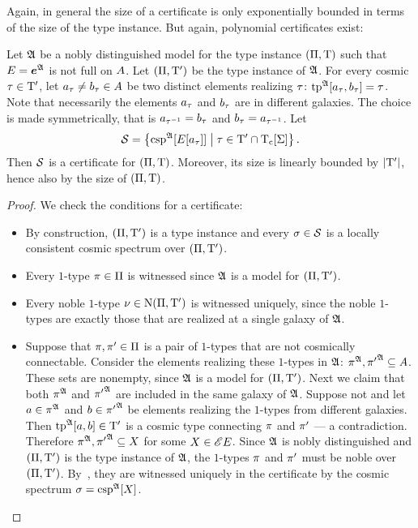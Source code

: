 Again, in general the size of a certificate is only exponentially bounded in
terms of the size of the type instance. But again, polynomial certificates
exist:
\begin{lemma}\label{lem:cert-extr-many}
Let $\mathfrak{A}$ be a nobly distinguished model for the type instance
$(\Pi,\mathrm{T})$ such that $E = \bm{e}^{\mathfrak{A}}$ is not full on $A$.
Let $(\Pi,{\mathrm{T}'})$ be the type instance of $\mathfrak{A}$. For every cosmic $\tau
\in {\mathrm{T}'}$, let $a_{\tau} \neq b_{\tau} \in A$ be two distinct elements
realizing $\tau$: $\operatorname{tp}^{\mathfrak{A}}[a_{\tau},b_{\tau}] = \tau$. Note that
necessarily the elements $a_{\tau}$ and $b_{\tau}$ are in different galaxies.
The choice is made symmetrically, that is $a_{\tau^{-1}} = b_{\tau}$ and
$b_{\tau} = a_{\tau^{-1}}$. Let
\[
  \mathcal{S} = \left\{\operatorname{csp}^{\mathfrak{A}}[E[a_{\tau}]]\mathrel{}\middle|\mathrel{}\tau \in {\mathrm{T}'} \cap
  \mathrm{T}_{\mathrm{c}}[\mathrm{\Sigma}]\right\}.
\]
Then $\mathcal{S}$ is a certificate for $(\Pi,\mathrm{T})$.
Moreover, its size is linearly bounded by $\left|{\mathrm{T}'}\right|$, hence also by the size
of $(\Pi,\mathrm{T})$.
\end{lemma}
\begin{proof}
We check the conditions for a certificate:
\begin{itemize}
  \item[\refcertcondIp] By construction, $(\Pi,{\mathrm{T}'})$ is a type instance
  and every $\sigma \in \mathcal{S}$ is a locally consistent cosmic spectrum over
  $(\Pi,{\mathrm{T}'})$.
  \item[\refcertcondIIp] Every $1$-type $\pi \in \Pi$ is witnessed since
  $\mathfrak{A}$ is a model for $(\Pi,{\mathrm{T}'})$.
  \item[\refcertcondIIIp] Every noble $1$-type $\nu \in \mathrm{\mathrm{N}}(\Pi,{\mathrm{T}'})$ is
  witnessed uniquely, since the noble $1$-types are exactly those that are
  realized at a single galaxy of $\mathfrak{A}$.
  \item[\refcertcondIVp] Suppose that $\pi, {\pi'} \in \Pi$ is a pair of
  $1$-types that are not cosmically connectable. Consider the elements realizing
  these $1$-types in $\mathfrak{A}$: $\pi^{\mathfrak{A}}, {\pi'}^{\mathfrak{A}} \subseteq A$.
  These sets are nonempty, since $\mathfrak{A}$ is a model for $(\Pi,{\mathrm{T}'})$.
  Next we claim that both $\pi^{\mathfrak{A}}$ and ${\pi'}^{\mathfrak{A}}$ are included in
  the same galaxy of $\mathfrak{A}$. Suppose not and let $a \in \pi^{\mathfrak{A}}$ and
  $b \in {\pi'}^{\mathfrak{A}}$ be elements realizing the $1$-types from different
  galaxies. Then $\operatorname{tp}^{\mathfrak{A}}[a,b] \in {\mathrm{T}'}$ is a cosmic type connecting
  $\pi$ and ${\pi'}$ --- a contradiction.
  Therefore $\pi^{\mathfrak{A}}, {\pi'}^{\mathfrak{A}} \subseteq X$ for some $X
  \in {\mathscr{E}E}$. Since $\mathfrak{A}$ is nobly distinguished and $(\Pi,{\mathrm{T}'})$ is
  the type instance of $\mathfrak{A}$, the $1$-types $\pi$ and ${\pi'}$ must be noble
  over $(\Pi,{\mathrm{T}'})$. By~, they are witnessed uniquely in
  the certificate by the cosmic spectrum $\sigma = \operatorname{csp}^{\mathfrak{A}}[X]$.
\end{itemize}
\end{proof}

